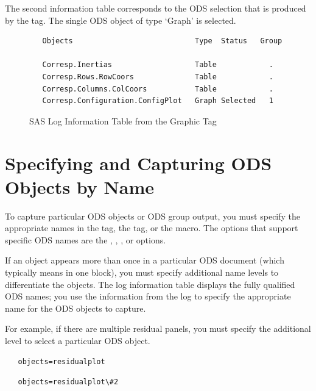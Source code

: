 \documentclass[article,oneside]{memoir}
\begin{document}
  The second information table corresponds to the ODS selection that is produced
  by the  tag. The single ODS object of type `Graph' is
  selected.

\begin{figure}[H]
\begin{snugshade}
\begin{verbatim}
   Objects                            Type  Status   Group

   Corresp.Inertias                   Table            .
   Corresp.Rows.RowCoors              Table            .
   Corresp.Columns.ColCoors           Table            .
   Corresp.Configuration.ConfigPlot   Graph Selected   1
\end{verbatim}
\end{snugshade}
\caption{SAS Log Information Table from the Graphic Tag}\label{loggraphinfo}
\end{figure}


\section{Specifying and Capturing ODS Objects by Name}
  To capture particular ODS objects or ODS group output, you
  must specify the appropriate names in the  tag,
  the  tag, or the  macro.
  The options that support specific ODS names are
  the ,
  , , or  options.

  If an object appears more than once in a particular ODS document
  (which typically means in one  block), you must specify additional
  name levels to differentiate the objects. The log information table
  displays the fully qualified ODS names; you use the information from
  the log to specify the appropriate name for the ODS objects to capture.

  For example, if there are multiple residual panels,
  you must specify the additional level to select a particular
  ODS object.

\begin{snugshade}
\begin{verbatim}
   objects=residualplot
\end{verbatim}
\end{snugshade}
\begin{snugshade}
\begin{verbatim}
   objects=residualplot\#2
\end{verbatim}
\end{snugshade}
\end{document}
